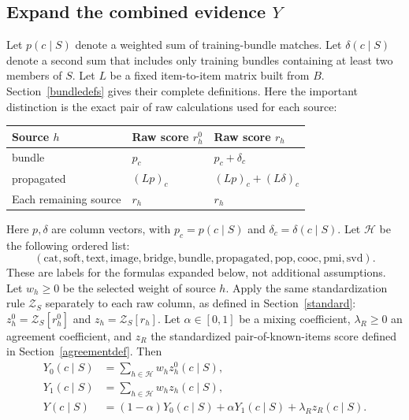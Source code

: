 \documentclass[11pt,a4paper]{article}
\numberwithin{equation}{section}
\begin{document}
\subsection{Expand the combined evidence $Y$}
Let $p(c\mid S)$ denote a weighted sum of training-bundle matches. Let
$\delta(c\mid S)$ denote a second sum that includes only training bundles containing
at least two members of $S$. Let $L$ be a fixed item-to-item matrix built from $B$.
Section~\ref{bundledefs} gives their complete definitions. Here the important distinction
is the exact pair of raw calculations used for each source:
\begin{center}\small
\begin{tabular}{@{}lll@{}}\toprule
Source $h$ & Raw score $r_h^0$ & Raw score $r_h$ \\\midrule
bundle & $p_c$ & $p_c+\delta_c$ \\
propagated & $(Lp)_c$ & $(Lp)_c+(L\delta)_c$ \\
Each remaining source & $r_h$ & $r_h$ \\\bottomrule
\end{tabular}\end{center}
Here $p,\delta$ are column vectors, with $p_c=p(c\mid S)$ and
$\delta_c=\delta(c\mid S)$. Let $\mathcal H$ be the following ordered list:
\[
(\mathrm{cat,soft,text,image,bridge,bundle,propagated,pop,cooc,pmi,svd}).
\]
These are labels for the formulas expanded below, not additional assumptions. Let
$w_h\ge0$ be the selected weight of source $h$. Apply the same standardization rule
$\mathcal Z_S$ separately to each raw column, as defined in Section~\ref{standard}:
$z_h^0=\mathcal Z_S[r_h^0]$ and $z_h=\mathcal Z_S[r_h]$.
Let $\alpha\in[0,1]$ be a mixing coefficient, $\lambda_R\ge0$ an agreement coefficient, and $z_R$
the standardized pair-of-known-items score defined in Section~\ref{agreementdef}. Then
\begin{align}
Y_0(c\mid S)&=\sum_{h\in\mathcal H}w_h z_h^0(c\mid S),\\
Y_1(c\mid S)&=\sum_{h\in\mathcal H}w_h z_h(c\mid S),\\
Y(c\mid S)&=(1-\alpha)Y_0(c\mid S)+\alpha Y_1(c\mid S)+\lambda_R z_R(c\mid S).\label{Y}
\end{align}
\end{document}
